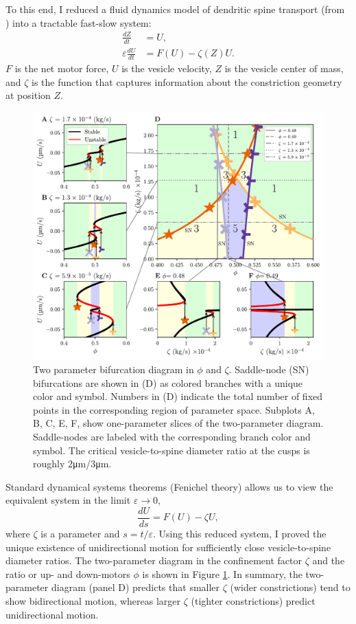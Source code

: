 \documentclass[a4paper,11pt]{article}
\newcommand{\ve}{\varepsilon}
\begin{document}
To this end, I reduced a fluid dynamics model of dendritic spine transport (from \cite{fai2017active}) into a tractable fast-slow system:
\begin{equation}\label{eq:fs1}
\begin{split}
\frac{dZ}{dt} &= U,\\
\ve\frac{dU}{dt} &= F(U) - \zeta(Z) U.
\end{split}
\end{equation}
$F$ is the net motor force, $U$ is the vesicle velocity, $Z$ is the vesicle center of mass, and $\zeta$ is the function that captures information about the constriction geometry at position $Z$.
\begin{figure}[ht!]
	\centering
	\includegraphics[width=\textwidth]{figures/bifurcations_colored.pdf}
	\caption{Two parameter bifurcation diagram in $\phi$ and $\zeta$. Saddle-node (SN) bifurcations are shown in (D) as colored branches with a unique color and symbol. Numbers in (D) indicate the total number of fixed points in the corresponding region of parameter space. Subplots A, B, C, E, F, show one-parameter slices of the two-parameter diagram. Saddle-nodes are labeled with the corresponding branch color and symbol. The critical vesicle-to-spine diameter ratio at the cusps is roughly 2\si{.\um}/3\si{.\um}.}\label{fig:2par}
\end{figure}
Standard dynamical systems theorems (Fenichel theory) allows us to view the equivalent system in the limit $\ve\rightarrow 0$,
\begin{equation*}
\frac{dU}{ds} = F(U) - \zeta U,
\end{equation*}
where $\zeta$ is a parameter and  $s=t/\ve$. Using this reduced system, I proved the unique existence of unidirectional motion for sufficiently close vesicle-to-spine diameter ratios. The two-parameter diagram in the confinement factor $\zeta$ and the ratio or up- and down-motors $\phi$ is shown in Figure \ref{fig:2par}. In summary, the two-parameter diagram (panel D) predicts that smaller $\zeta$ (wider constrictions) tend to show bidirectional motion, whereas larger $\zeta$ (tighter constrictions) predict unidirectional motion.
\end{document}
